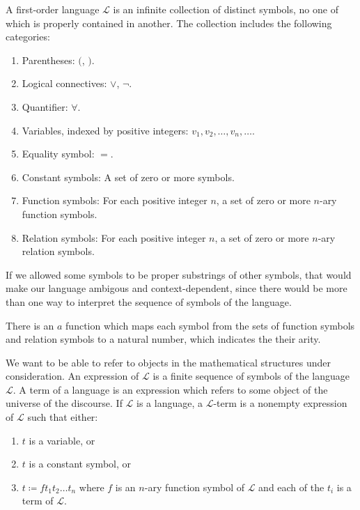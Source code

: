 \documentclass[letterpaper, 10pt]{article}
\begin{document}
	A first-order language $\mathcal{L}$ is an infinite collection of distinct
	symbols, no one of which is properly contained in another. The collection
	includes the following categories:
	\begin{enumerate}
		\item Parentheses: $($, $)$.
		\item Logical connectives: $\lor$, $\neg$.
		\item Quantifier: $\forall$.
		\item Variables, indexed by positive integers: $v_1,v_2,\ldots,v_n,\ldots$.
		\item Equality symbol: $=$.
		\item Constant symbols: A set of zero or more symbols.
		\item Function symbols: For each positive integer $n$, a set of zero
			or more $n$-ary function symbols.
		\item Relation symbols: For each positive integer $n$, a set of zero or
			more $n$-ary relation symbols.
	\end{enumerate}

	If we allowed some symbols to be proper substrings of other symbols, that
	would make our language ambigous and context-dependent, since there would be
	more than one way to interpret the sequence of symbols of the language.

	There is an $a$ function which maps each symbol from the sets of function
	symbols and relation symbols to a natural number, which indicates the their
	arity.

	We want to be able to refer to objects in the mathematical structures under
	consideration.
	An expression of $\mathcal{L}$ is a finite sequence of symbols of the
	language $\mathcal{L}$. A term of a language is an expression which refers
	to some object of the universe of the discourse.
	If $\mathcal{L}$ is a language, a $\mathcal{L}$-term is a nonempty
	expression of $\mathcal{L}$ such that either:
	\begin{enumerate}
		\item $t$ is a variable, or
		\item $t$ is a constant symbol, or
		\item $t \coloneq ft_{1}t_{2}\ldots t_{n}$ where $f$ is an $n$-ary
			function symbol of $\mathcal{L}$ and each of the $t_i$ is a term of
			$\mathcal{L}$.
	\end{enumerate}
	
\end{document}
